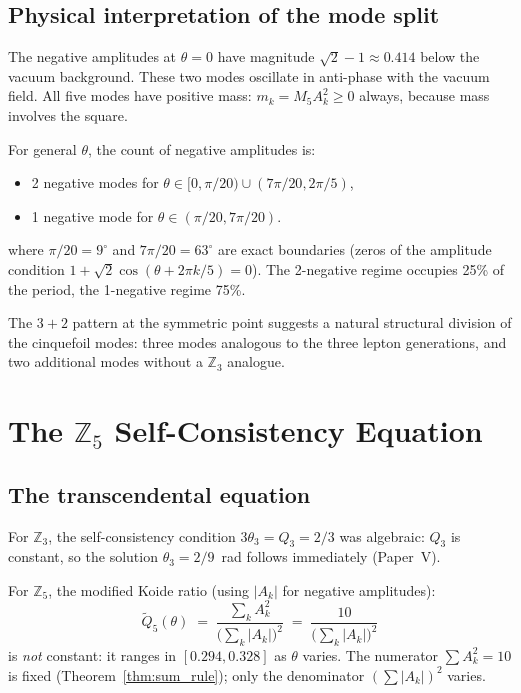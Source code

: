 \documentclass[11pt]{article}
\begin{document}
\subsection{Physical interpretation of the mode split}

The negative amplitudes at $\theta = 0$ have magnitude $\sqrt{2} - 1 \approx 0.414$
below the vacuum background.
These two modes oscillate in anti-phase with the vacuum field.
All five modes have positive mass: $m_k = M_5 A_k^2 \geq 0$ always,
because mass involves the square.

For general $\theta$, the count of negative amplitudes is:
\begin{itemize}
  \item 2 negative modes for $\theta \in [0, \pi/20) \cup (7\pi/20, 2\pi/5)$,
  \item 1 negative mode for $\theta \in (\pi/20, 7\pi/20)$.
\end{itemize}
where $\pi/20 = 9^\circ$ and $7\pi/20 = 63^\circ$ are exact boundaries
(zeros of the amplitude condition $1 + \sqrt{2}\cos(\theta + 2\pi k/5) = 0$).
The 2-negative regime occupies 25\% of the period, the 1-negative regime 75\%.

The $3 + 2$ pattern at the symmetric point suggests a natural structural
division of the cinquefoil modes: three modes analogous to the three lepton
generations, and two additional modes without a $\mathbb{Z}_3$ analogue.


\section{The $\mathbb{Z}_5$ Self-Consistency Equation}
\label{sec:Z5_sc}

\subsection{The transcendental equation}

For $\mathbb{Z}_3$, the self-consistency condition $3\theta_3 = Q_3 = 2/3$
was algebraic: $Q_3$ is constant, so the solution $\theta_3 = 2/9$~rad
follows immediately (Paper~V).

For $\mathbb{Z}_5$, the modified Koide ratio (using $|A_k|$ for negative
amplitudes):
\begin{equation}
  \tilde{Q}_5(\theta) \;=\; \frac{\sum_k A_k^2}{\bigl(\sum_k |A_k|\bigr)^2}
  \;=\; \frac{10}{\bigl(\sum_k |A_k|\bigr)^2}
  \label{eq:Q5_tilde}
\end{equation}
is \emph{not} constant: it ranges in $[0.294, 0.328]$ as $\theta$ varies.
The numerator $\sum A_k^2 = 10$ is fixed (Theorem~\ref{thm:sum_rule});
only the denominator $(\sum |A_k|)^2$ varies.
\end{document}
